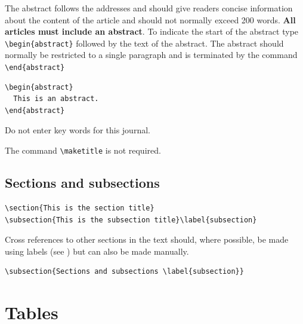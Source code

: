 \documentclass[a4paper]{jpconf}
\begin{document}
The abstract follows the addresses and
should give readers concise information about the content 
of the article and should not normally exceed 200 
words. {\bf All articles must include an abstract}. To indicate the start 
of the abstract type \verb"\begin{abstract}" followed by the text of the 
abstract.  The abstract should normally be restricted 
to a single paragraph and is terminated by the command
\verb"\end{abstract}"

\begin{verbatim}
\begin{abstract}
  This is an abstract.
\end{abstract}
\end{verbatim}

Do not enter key words for this journal.

The command \verb"\maketitle" is not
required.

\subsection{Sections and subsections}\label{subsection}

\begin{verbatim}
\section{This is the section title}
\subsection{This is the subsection title}\label{subsection}
\end{verbatim}

Cross references to other sections in the text should, where possible, 
be made using 
labels (see ) 
but can also be made manually.

\begin{verbatim}
\subsection{Sections and subsections \label{subsection}}
\end{verbatim}

\section{Tables}
\end{document}
